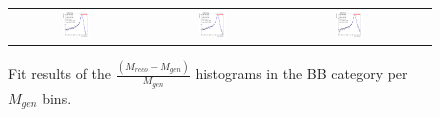 \begin{figure}[ht]
\begin{center}
\begin{tabular}{cccc}
      \includegraphics[width=0.22\textwidth]{figures/Zprime/2017/mass_resolution/High_Mass/BB_2300_3500}&
      \includegraphics[width=0.22\textwidth]{figures/Zprime/2017/mass_resolution/High_Mass/BB_3500_4500}& 
      \includegraphics[width=0.22\textwidth]{figures/Zprime/2017/mass_resolution/High_Mass/BB_4500_5000}\\
    \end{tabular}
    \caption{Fit results of the $\frac{(M_{reco} - M_{gen})}{M_{gen}}$ histograms in the BB category per $M_{gen}$ bins.
    \label{fig:fit_BB}}
  \end{center}
\end{figure}

